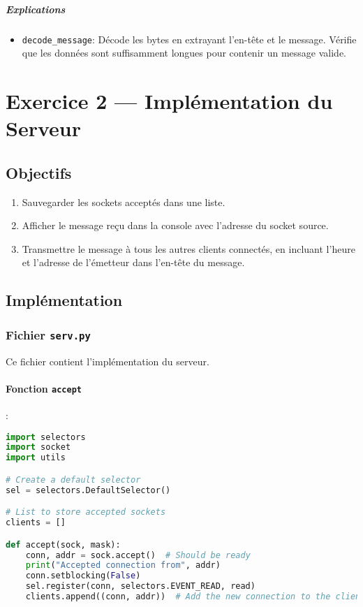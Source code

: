 \documentclass{article}
\begin{document}
\subparagraph{Explications}

\begin{itemize}
    \item \texttt{decode\_message}: Décode les bytes en extrayant l'en-tête et le message. Vérifie que les données sont suffisamment longues pour contenir un message valide.
\end{itemize}

\section{Exercice 2 — Implémentation du Serveur}

\subsection{Objectifs}

\begin{enumerate}
    \item Sauvegarder les sockets acceptés dans une liste.
    \item Afficher le message reçu dans la console avec l'adresse du socket source.
    \item Transmettre le message à tous les autres clients connectés, en incluant l'heure et l'adresse de l'émetteur dans l'en-tête du message.
\end{enumerate}

\subsection{Implémentation}

\subsubsection{Fichier \texttt{serv.py}}

Ce fichier contient l'implémentation du serveur.

\paragraph{Fonction \texttt{accept}}:

\begin{lstlisting}[language=Python, caption=accept dans serv.py]
import selectors
import socket
import utils

# Create a default selector
sel = selectors.DefaultSelector()

# List to store accepted sockets
clients = []

def accept(sock, mask):
    conn, addr = sock.accept()  # Should be ready
    print("Accepted connection from", addr)
    conn.setblocking(False)
    sel.register(conn, selectors.EVENT_READ, read)
    clients.append((conn, addr))  # Add the new connection to the clients list
\end{lstlisting}
\end{document}
